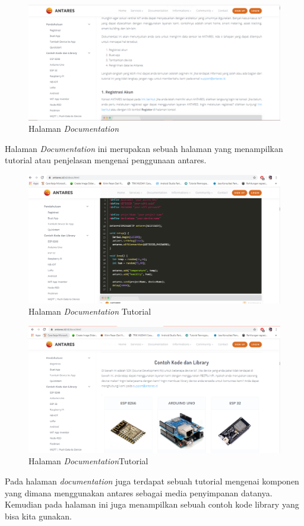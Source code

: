 \begin{enumerate}
    \begin{figure}[H]
    \centering
    \includegraphics[width=1\textwidth]{figures/antares10.png}
    \caption{Halaman \textit{Documentation}}
    \label{print}
    \end{figure}
    \par Halaman \textit{Documentation} ini merupakan sebuah halaman yang menampilkan tutorial atau penjelasan mengenai penggunaan antares.
    \begin{figure}[H]
    \centering
    \includegraphics[width=1\textwidth]{figures/antares11.png}
    \caption{Halaman \textit{Documentation} Tutorial}
    \label{print}
    \end{figure}
    
       \begin{figure}[H]
    \centering
    \includegraphics[width=1\textwidth]{figures/antares12.png}
    \caption{Halaman \textit{Documentation}Tutorial}
    \label{print}
    \end{figure}
    \par Pada halaman \textit{documentation} juga terdapat sebuah tutorial mengenai komponen yang dimana menggunakan antares sebagai media penyimpanan datanya. Kemudian pada halaman ini juga menampilkan sebuah contoh kode library yang bisa kita gunakan.
\end{enumerate} 